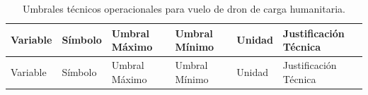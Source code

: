 \documentclass[
  spanish,
  us-letterpaper,
]{scrreprt}
\numberwithin{equation}{section}
\begin{document}
\begin{longtable}[]{@{}
  >{\raggedright\arraybackslash}p{}
  >{\raggedright\arraybackslash}p{}
  >{\raggedright\arraybackslash}p{}
  >{\raggedright\arraybackslash}p{}
  >{\raggedright\arraybackslash}p{}
  >{\raggedright\arraybackslash}p{}@{}}
\caption{Umbrales técnicos operacionales para vuelo de dron de carga
humanitaria.}\label{tbl-umbrales-operativos}\tabularnewline
\toprule\noalign{}
\begin{minipage}[b]{\linewidth}\raggedright
Variable
\end{minipage} & \begin{minipage}[b]{\linewidth}\raggedright
Símbolo
\end{minipage} & \begin{minipage}[b]{\linewidth}\raggedright
Umbral Máximo
\end{minipage} & \begin{minipage}[b]{\linewidth}\raggedright
Umbral Mínimo
\end{minipage} & \begin{minipage}[b]{\linewidth}\raggedright
Unidad
\end{minipage} & \begin{minipage}[b]{\linewidth}\raggedright
Justificación Técnica
\end{minipage} \\
\midrule\noalign{}
\endfirsthead
\toprule\noalign{}
\begin{minipage}[b]{\linewidth}\raggedright
Variable
\end{minipage} & \begin{minipage}[b]{\linewidth}\raggedright
Símbolo
\end{minipage} & \begin{minipage}[b]{\linewidth}\raggedright
Umbral Máximo
\end{minipage} & \begin{minipage}[b]{\linewidth}\raggedright
Umbral Mínimo
\end{minipage} & \begin{minipage}[b]{\linewidth}\raggedright
Unidad
\end{minipage} & \begin{minipage}[b]{\linewidth}\raggedright
Justificación Técnica
\end{minipage} \\

\end{longtable}
\end{document}
